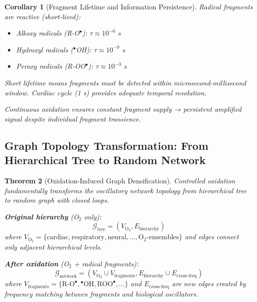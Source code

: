 \documentclass[11pt,a4paper]{article}
\newtheorem{theorem}{Theorem}[section]
\newtheorem{corollary}[theorem]{Corollary}
\theoremstyle{definition}
\theoremstyle{remark}
\begin{document}
\begin{corollary}[Fragment Lifetime and Information Persistence]
Radical fragments are reactive (short-lived):
\begin{itemize}
\item Alkoxy radicals (R-O$^\bullet$): $\tau \approx 10^{-6}$ s
\item Hydroxyl radicals ($^\bullet$OH): $\tau \approx 10^{-9}$ s  
\item Peroxy radicals (R-OO$^\bullet$): $\tau \approx 10^{-3}$ s
\end{itemize}

Short lifetime means fragments must be detected within microsecond-millisecond window. Cardiac cycle (1 s) provides adequate temporal resolution.

Continuous oxidation ensures constant fragment supply → persistent amplified signal despite individual fragment transience.
\end{corollary}

\subsection{Graph Topology Transformation: From Hierarchical Tree to Random Network}

\begin{theorem}[Oxidation-Induced Graph Densification]
\label{thm:graph_densification}
Controlled oxidation fundamentally transforms the oscillatory network topology from hierarchical tree to random graph with closed loops.

\textbf{Original hierarchy} (O$_2$ only):
\begin{equation}
\mathcal{G}_{\text{tree}} = (V_{\text{O}_2}, E_{\text{hierarchy}})
\end{equation}
where $V_{\text{O}_2} = \{\text{cardiac}, \text{respiratory}, \text{neural}, \ldots, \text{O}_2\text{-ensembles}\}$ and edges connect only adjacent hierarchical levels.

\textbf{After oxidation} (O$_2$ + radical fragments):
\begin{equation}
\mathcal{G}_{\text{network}} = (V_{\text{O}_2} \cup V_{\text{fragments}}, E_{\text{hierarchy}} \cup E_{\text{cross-freq}})
\end{equation}
where $V_{\text{fragments}} = \{\text{R-O}^\bullet, {}^\bullet\text{OH}, \text{ROO}^\bullet, \ldots\}$ and $E_{\text{cross-freq}}$ are new edges created by frequency matching between fragments and biological oscillators.
\end{theorem}
\end{document}
